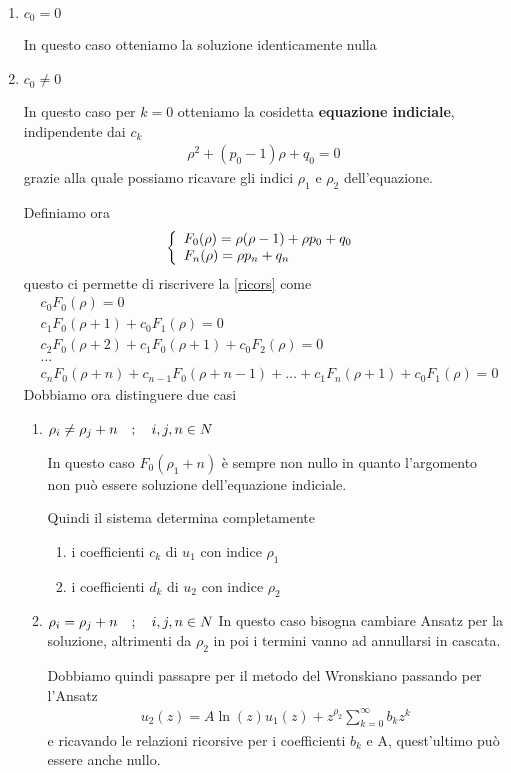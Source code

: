 \begin{enumerate}
	\item $c_0 = 0$
	
	In questo caso otteniamo la soluzione identicamente nulla
	\item $c_0 \neq 0$
	
	In questo caso per $k=0$ otteniamo la cosidetta \textbf{equazione indiciale}, indipendente dai $c_k$
	\begin{align}
		\rho^2 + (p_0 -1)\rho + q_0 = 0
	\end{align}
	grazie alla quale possiamo ricavare gli indici $\rho_1$ e $\rho_2$ dell'equazione. 
	
	Definiamo ora
	\begin{align}
		\double{F_0(\rho) = \rho(\rho -1) + \rho p_0 + q_0}{F_n(\rho) = \rho p_n + q_n \hfill}
	\end{align}
	questo ci permette di riscrivere la \ref{ricors} come
	\begin{align}
		&c_0 F_0(\rho) = 0\\
		&c_1 F_0(\rho + 1) + c_0 F_1(\rho) = 0\\
		&c_2 F_0(\rho + 2) + c_1 F_0(\rho + 1) + c_0 F_2(\rho) = 0\\
		&\dots \nonumber\\
		&c_n F_0(\rho + n) + c_{n-1} F_0(\rho + n-1) + \dots + c_1 F_n(\rho + 1) + c_0 F_1(\rho) = 0	 	
	\end{align}
 	Dobbiamo ora distinguere due casi
 	\begin{enumerate}
 		\item $\rho_i \neq \rho_j + n \quad ; \quad i,j,n \in N$
 		
 		In questo caso $F_0(\rho_1 + n)$ è sempre non nullo in quanto l'argomento non può essere soluzione dell'equazione indiciale. 
 		
 		Quindi il sistema determina completamente \begin{enumerate}
 			\item i coefficienti $c_k$ di $u_1$ con indice $\rho_1$
 			\item i coefficienti $d_k$ di $u_2$ con indice $\rho_2$
 		\end{enumerate}
 		\newpage
 		\item $\rho_i =    \rho_j + n \quad ; \quad i,j,n \in N$
 		In questo caso bisogna cambiare Ansatz per la soluzione, altrimenti da $\rho_2$ in poi i termini vanno ad annullarsi in cascata.
 		
 		Dobbiamo quindi passapre per il metodo del Wronskiano passando per l'Ansatz
 		\begin{align}
 			u_2(z) = A\ln(z)u_1(z) + z^{\rho_2} \sum_{k=0}^{\infty} b_k z^k
 		\end{align}
 		e ricavando le relazioni ricorsive per i coefficienti $b_k$ e A, quest'ultimo può essere anche nullo. 		
 	\end{enumerate}
\end{enumerate}


